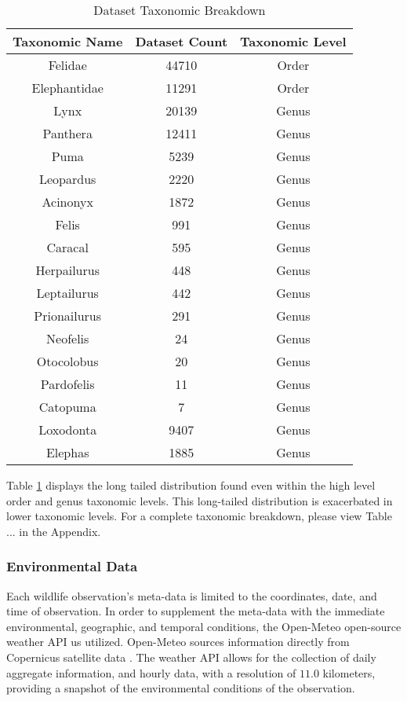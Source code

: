 \documentclass[conference]{IEEEtran}
\begin{document}
        \begin{table}[htbp]
        \caption{Dataset Taxonomic Breakdown}
        \begin{center}
        \begin{tabular}{|c|c|c|}
        \hline
        Taxonomic Name & Dataset Count & Taxonomic Level \\
        \hline
        Felidae & 44710 & Order \\
        Elephantidae & 11291 & Order \\
        \hline
        Lynx & 20139 & Genus \\
        Panthera & 12411 & Genus \\
        Puma & 5239 & Genus \\
        Leopardus & 2220 & Genus \\
        Acinonyx & 1872 & Genus \\
        Felis & 991 & Genus \\
        Caracal & 595 & Genus \\
        Herpailurus & 448 & Genus \\
        Leptailurus & 442 & Genus \\
        Prionailurus & 291 & Genus \\
        Neofelis & 24 & Genus \\
        Otocolobus & 20 & Genus \\
        Pardofelis & 11 & Genus \\
        Catopuma & 7 & Genus \\
        Loxodonta & 9407 & Genus \\
        Elephas & 1885 & Genus \\
        \hline
        \end{tabular}
        \label{table: taxonomic_breakdown}
        \end{center}
        \end{table}

        Table \ref{table: taxonomic_breakdown} displays the long tailed distribution found even within the high level order and genus taxonomic levels. This long-tailed distribution is exacerbated in lower taxonomic levels. For a complete taxonomic breakdown, please view Table ... in the Appendix. 

        \subsubsection{Environmental Data}
        Each wildlife observation's meta-data is limited to the coordinates, date, and time of observation. In order to supplement the meta-data with the immediate environmental, geographic, and temporal conditions, the Open-Meteo \cite{openmeteo} open-source weather API us utilized. Open-Meteo sources information directly from Copernicus satellite data \cite{era5}. The weather API allows for the collection of daily aggregate information, and hourly data, with a resolution of $11.0$ kilometers, providing a snapshot of the environmental conditions of the observation.
\end{document}
